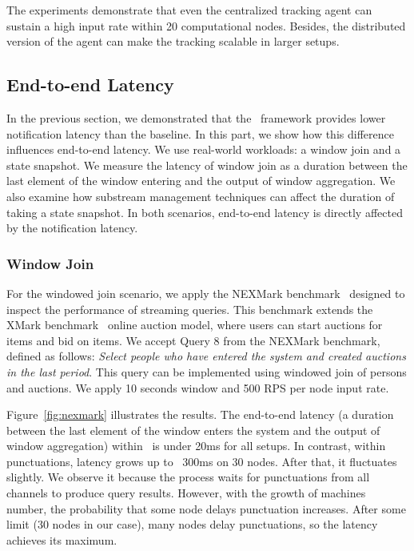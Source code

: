 The experiments demonstrate that even the centralized tracking agent can sustain a high input rate within 20 computational nodes. Besides, the distributed version of the agent can make the tracking scalable in larger setups.

\subsection{End-to-end Latency}

In the previous section, we demonstrated that the \tracker\ framework provides lower notification latency than the baseline. In this part, we show how this difference influences end-to-end latency. We use real-world workloads: a window join and a state snapshot. We measure the latency of window join as a duration between the last element of the window entering and the output of window aggregation. We also examine how substream management techniques can affect the duration of taking a state snapshot. In both scenarios, end-to-end latency is directly affected by the notification latency. 

\subsubsection{Window Join}
For the windowed join scenario, we apply the NEXMark benchmark~\cite{tucker2008nexmark} designed to inspect the performance of streaming queries. This benchmark extends the XMark benchmark~\cite{schmidt2002xmark} online auction model, where users can start auctions for items and bid on items. We accept Query 8 from the NEXMark benchmark, defined as follows: {\em Select people who have entered the system and created auctions in the last period}. This query can be implemented using windowed join of persons and auctions. We apply 10 seconds window and 500 RPS per node input rate.

Figure~\ref{fig:nexmark} illustrates the results. The end-to-end latency (a duration between the last element of the window enters the system and the output of window aggregation) within \tracker\ is under 20ms for all setups. In contrast, within punctuations, latency grows up to ~300ms on 30 nodes. After that, it fluctuates slightly. We observe it because the process waits for punctuations from all channels to produce query results. However, with the growth of machines number, the probability that some node delays punctuation increases. After some limit (30 nodes in our case), many nodes delay punctuations, so the latency achieves its maximum. 

